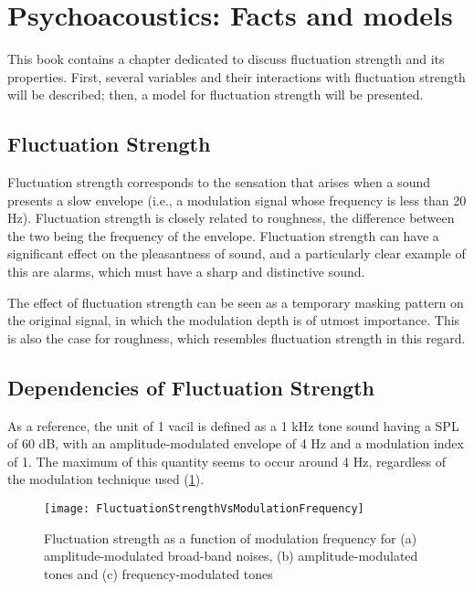 \documentclass%
  [/Users/rodrigo/Documents/TUe/thesis/latex/topic/fluctuation_strength/
  literature_review.tex]
  {subfiles}
\begin{document}
\section{Psychoacoustics: Facts and models}

This book contains a chapter dedicated to discuss fluctuation strength and its
properties. First, several variables and their interactions with fluctuation
strength will be described; then, a model for fluctuation strength will be
presented.

\subsection{Fluctuation Strength}

Fluctuation strength corresponds to the sensation that arises when a sound
presents a slow envelope (i.e., a modulation signal whose frequency is less than
20 Hz). Fluctuation strength is closely related to roughness, the difference
between the two being the frequency of the envelope.
Fluctuation strength can have a significant effect on the pleasantness of sound,
and a particularly clear example of this are alarms, which must have a sharp and
distinctive sound.

The effect of fluctuation strength can be seen as a temporary masking pattern on
the original signal, in which the modulation depth is of utmost importance. This
is also the case for roughness, which resembles fluctuation strength in this
regard.

\subsection{Dependencies of Fluctuation Strength}

As a reference, the unit of 1 vacil is defined as a 1 kHz tone sound having a
SPL of 60 dB, with an amplitude-modulated envelope of 4 Hz and a modulation
index of 1. The maximum of this quantity seems to occur around 4 Hz, regardless
of the modulation technique used (\cref{fig:flucstrenvmodfreq}).

\begin{figure}
  \centering
  \texttt{[image: FluctuationStrengthVsModulationFrequency]}
  \caption{Fluctuation strength as a function of modulation frequency for (a)
    amplitude-modulated broad-band noises, (b) amplitude-modulated tones and (c)
    frequency-modulated tones~\cite[pp.~248]{Fastl2007Psychoacoustics}}
\label{fig:flucstrenvmodfreq}
\end{figure}
\end{document}
